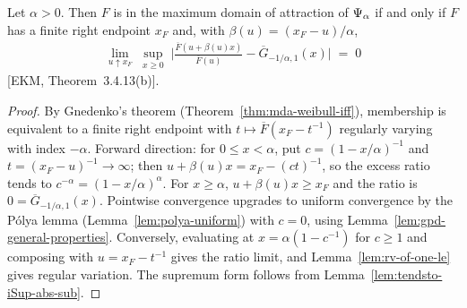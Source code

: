 \begin{theorem}
  \label{thm:pbdh-weibull-iff}
  \leanok
  Let $\alpha > 0$. Then $F$ is in the maximum domain of attraction of $\Psi_{\alpha}$ if
  and only if $F$ has a finite right endpoint $x_F$ and, with $\beta(u) = (x_F - u)/\alpha$,
  \begin{align*}
    \lim_{u \uparrow x_F} \; \sup_{x \ge 0} \; \Big| \frac{\overline{F}(u + \beta(u) x)}{\overline{F}(u)}
      - \overline{G}_{-1/\alpha, 1}(x) \Big| \; = \; 0
  \end{align*}
  [EKM, Theorem~3.4.13(b)].
\end{theorem}
\begin{proof}
  \leanok
  By Gnedenko's theorem (Theorem~\ref{thm:mda-weibull-iff}), membership is equivalent to a finite
  right endpoint with $t \mapsto \overline{F}(x_F - t^{-1})$ regularly varying with index
  $-\alpha$. Forward direction: for $0 \le x < \alpha$, put $c = (1 - x/\alpha)^{-1}$ and
  $t = (x_F - u)^{-1} \to \infty$; then $u + \beta(u) x = x_F - (ct)^{-1}$, so the excess ratio
  tends to $c^{-\alpha} = (1 - x/\alpha)^\alpha$. For $x \ge \alpha$, $u + \beta(u) x \ge x_F$ and
  the ratio is $0 = \overline{G}_{-1/\alpha,1}(x)$. Pointwise convergence upgrades to uniform
  convergence by the Pólya lemma (Lemma~\ref{lem:polya-uniform}) with $c = 0$, using
  Lemma~\ref{lem:gpd-general-properties}. Conversely, evaluating at $x = \alpha(1 - c^{-1})$ for
  $c \ge 1$ and composing with $u = x_F - t^{-1}$ gives the ratio limit, and
  Lemma~\ref{lem:rv-of-one-le} gives regular variation. The supremum form follows from
  Lemma~\ref{lem:tendsto-iSup-abs-sub}.
\end{proof}

